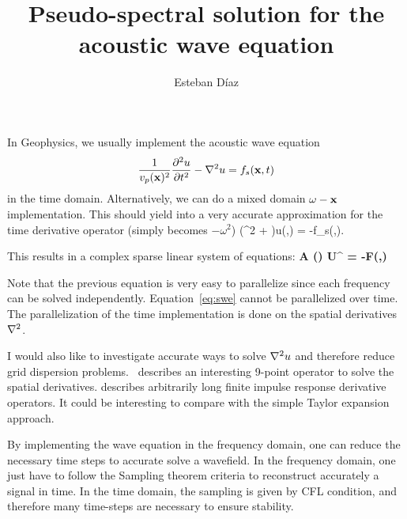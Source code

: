 \documentclass[10pt]{article}
\author{Esteban D\'{i}az}
\title{Pseudo-spectral solution for the acoustic wave equation}{}
\begin{document}
\maketitle

In Geophysics,
 we usually implement the acoustic wave equation
\begin{equation}
 \frac{1}{v_p({\bf x})^2}\frac{\partial^2 u}{\partial t^2}- \nabla^2 {u} = f_s({\bf x},t) 
\label{eq:swe}
\end{equation}
in the time domain. Alternatively, we can do a mixed domain $\omega-{\bf x}$ implementation. This should yield into a very accurate approximation
for the time derivative operator (simply becomes $-\omega^2$)
\beq
(\omega^2 +\LAPL{} )u(\xx,\omega) = -f_s(\xx,\omega).
\eeq

This results in a complex sparse linear system of equations:
\beq
 \bf{A} (\omega) {\bf U}^{\omega} = -\bf{F}(\xx,\omega)
\eeq

Note that the previous equation is very easy to parallelize since 
each frequency can be solved independently. Equation~\ref{eq:swe}
cannot be parallelized over time. The parallelization of the time
implementation is done on the spatial derivatives $\nabla^2 {}$.


I would also like to investigate accurate ways to 
solve $\nabla^2 {u}$ and therefore
reduce grid dispersion problems.~\cite{chu} describes an interesting
9-point operator to solve the spatial derivatives.\cite{917976} describes
arbitrarily long finite impulse response derivative operators. It 
could be interesting to compare with the simple Taylor
expansion approach.

By implementing the wave equation in the frequency domain, one can reduce
the necessary time steps to accurate solve a wavefield. In the frequency
domain, one just have to follow the Sampling theorem criteria  to reconstruct accurately a signal in
time. In the time domain, the sampling is given by CFL condition, and therefore many time-steps are necessary to ensure stability. 





\end{document}
